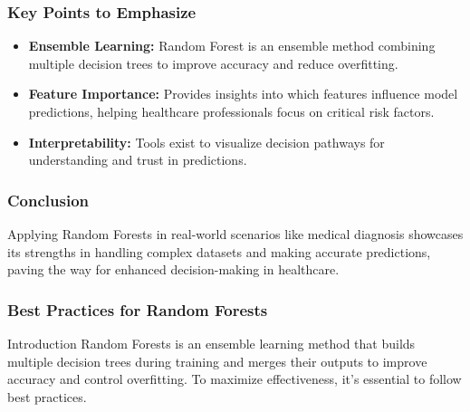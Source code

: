 \documentclass[aspectratio=169]{beamer}
\begin{document}
\begin{frame}[fragile]
    \frametitle{Key Points to Emphasize}
    \begin{itemize}
        \item \textbf{Ensemble Learning:} Random Forest is an ensemble method combining multiple decision trees to improve accuracy and reduce overfitting.
        \item \textbf{Feature Importance:} Provides insights into which features influence model predictions, helping healthcare professionals focus on critical risk factors.
        \item \textbf{Interpretability:} Tools exist to visualize decision pathways for understanding and trust in predictions.
    \end{itemize}
\end{frame}

\begin{frame}[fragile]
    \frametitle{Conclusion}
    Applying Random Forests in real-world scenarios like medical diagnosis showcases its strengths in handling complex datasets and making accurate predictions, paving the way for enhanced decision-making in healthcare.
\end{frame}

\begin{frame}
    \frametitle{Best Practices for Random Forests}
    \begin{block}{Introduction}
        Random Forests is an ensemble learning method that builds multiple decision trees during training and merges their outputs to improve accuracy and control overfitting. To maximize effectiveness, it’s essential to follow best practices.
    \end{block}
\end{frame}
\end{document}
